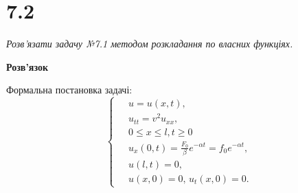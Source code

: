 

%


\section[Задача №7.2]{7.2}

\textit{Розв’язати задачу №7.1 методом розкладання по власних функціях.}

\begin{center}
    \large{\textbf{Розв'язок}}
\end{center}

\noindent Формальна постановка задачі:
\begin{equation} %
    \left\{ \begin{aligned} 
            \;&u = u(x,t), \\
            &u_{tt} = v^2 u_{xx}, \\
            &0 \leq x \leq l, t \geq 0 \\
            &u_x(0,t) = \frac{F_0}{\beta} e^{-\alpha t} = f_0 e^{-\alpha t},\\
            &u(l,t) = 0, \\
            &u(x,0) = 0, \, u_t(x,0) = 0.
    \end{aligned} \right.
\end{equation}

